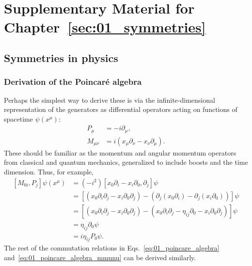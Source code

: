 \chapter{Supplementary Material for Chapter~\ref{sec:01_symmetries}}
\label{app:01}

\section{Symmetries in physics}
\label{app:01_ymmetries}

\subsection{Derivation of the Poincaré algebra}
\label{app:01_poincare_algebra}

Perhaps the simplest way to derive these is via the infinite-dimensional representation of the generators as differential operators acting on functions of spacetime $\psi(x^\mu)$:
\begin{equation}
	\label{eq:01_poincare_generators_diff_representation}
	\begin{split}
		P_\mu &= -i\partial_\mu, \\
		M_{\mu\nu} &= i(x_\mu \partial_\nu - x_\nu \partial_\mu).
	\end{split}
\end{equation}
These should be familiar as the momentum and angular momentum operators from classical and quantum mechanics, generalized to include boosts and the time dimension.
Thus, for example,
\begin{equation}
	\label{eq:01_poincare_commutation_derivation_example}
	\begin{split}
	[M_{0i}, P_j]\psi(x^\mu) 
		&= (-i^2)[x_0\partial_i - x_i\partial_0, \partial_j]\psi \\
		&= [(x_0\partial_i\partial_j - x_i\partial_0\partial_j) - (\partial_j(x_0\partial_i) - \partial_j(x_i\partial_0))]\psi \\
		&= [(x_0\partial_i\partial_j - x_i\partial_0\partial_j) - (x_0\partial_i\partial_j - \eta_{ij}\partial_0 -  x_i\partial_0\partial_j)]\psi \\
		&= \eta_{ij}\partial_0 \psi \\
		&= i\eta_{ij}P_0\psi.
	\end{split}
\end{equation}
The rest of the commutation relations in Eqs.~\ref{eq:01_poincare_algebra} and~\ref{eq:01_poincare_algebra_mmunu} can be derived similarly.


